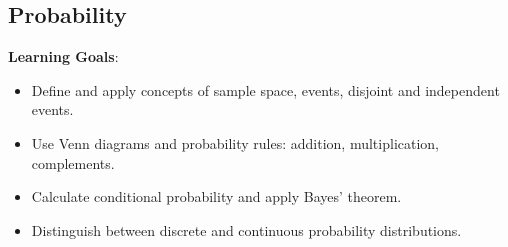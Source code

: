 \documentclass{article}
\begin{document}

\subsection{Probability}
\textbf{Learning Goals}:
\begin{itemize}
    \item Define and apply concepts of sample space, events, disjoint and independent events.
    \item Use Venn diagrams and probability rules: addition, multiplication, complements.
    \item Calculate conditional probability and apply Bayes' theorem.
    \item Distinguish between discrete and continuous probability distributions.
\end{itemize}
\end{document}
